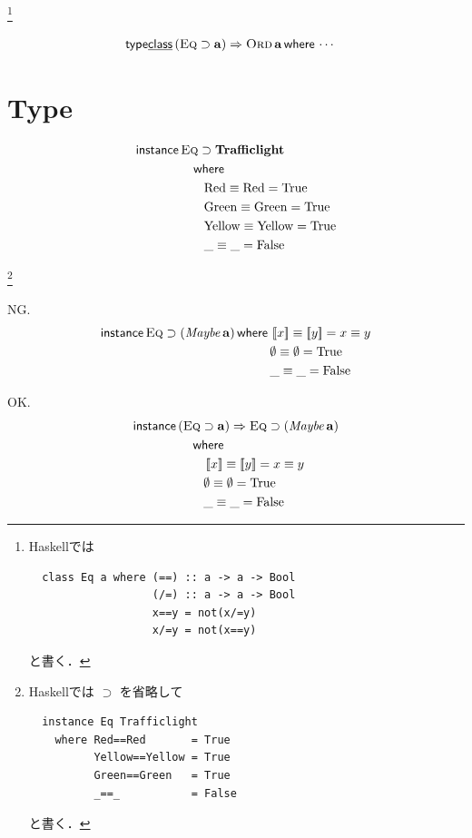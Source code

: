 \documentclass[a4paper,twocolumn]{jsbook}
\def\[{\left[\!\left[}
\def\]{\right]\!\right]}
\newcommand{\programminglanguage}[1]{\textsf{#1}}
\newcommand{\haskell}{\programminglanguage{Haskell}}
\newcommand{\mKeyword}[1]{\mathsf{#1}} %
\newcommand{\mKeywordUnderline}[1]{\text{\underline{\textsf{#1}}}} %
\newcommand{\mInstanceKeyword}{\mKeyword{instance}}
\newcommand{\mTypeClass}{\mKeyword{type}\mKeywordUnderline{class}}
\newcommand{\mWhereKeyword}{\mKeyword{where}}
\DeclareMathOperator{\mInstance}{\mInstanceKeyword}
\DeclareMathOperator{\mWhere}{\mWhereKeyword}
\newcommand{\mConst}[1]{\mathrm{#1}}
\newcommand{\mSpecialConst}[1]{\mathrm{#1}} %
\newcommand{\mFalse}{\mSpecialConst{False}}
\newcommand{\mNothing}{\emptyset}
\newcommand{\mTrue}{\mSpecialConst{True}}
\newcommand{\mAnyParam}{\_}
\DeclareMathOperator{\mConst}{const}
\DeclareMathOperator{\mLetEq}{\triangleq}
\newcommand{\mType}[1]{\mathbf{#1}}
\newcommand{\mMaybeWith}[1]{\[#1\]}
\newcommand{\mTypeConstructor}[1]{\mathit{#1}} %
\DeclareMathOperator{\mMaybeTypeConstructor}{\mTypeConstructor{Maybe}}
\newcommand{\mSpecialTypeClass}[1]{\textsc{#1}} %
\newcommand{\mEqTypeClass}{\mSpecialTypeClass{Eq}}
\newcommand{\mOrdTypeClass}{\mSpecialTypeClass{Ord}}
\newcommand{\mWhere}[2]{\mathbin{\mWhereKeyword}#1\mLetEq#2}
\begin{document}
{}\footnote{\haskell では
\begin{verbatim}
  class Eq a where (==) :: a -> a -> Bool
                   (/=) :: a -> a -> Bool
                   x==y = not(x/=y)
                   x/=y = not(x==y)
\end{verbatim}
と書く．}

\begin{align*}
\mTypeClass\,(\mEqTypeClass\supset\mType{a})\Rightarrow\mathop{\mOrdTypeClass}\mType{a}\mWhere{}
&\dotsb
\end{align*}

\section{Type}

\begin{align*}
\mInstance&
\mathop{\mEqTypeClass}\supset\mType{Trafficlight}\\
&\quad\mWhere{}\\
&\qquad\mConst{Red}\equiv\mConst{Red}=\mTrue\\
&\qquad\mConst{Green}\equiv\mConst{Green}=\mTrue\\
&\qquad\mConst{Yellow}\equiv\mConst{Yellow}=\mTrue\\
&\qquad\mAnyParam\equiv\mAnyParam=\mFalse
\end{align*}

{}\footnote{\haskell では $\supset$ を省略して
\begin{verbatim}
  instance Eq Trafficlight
    where Red==Red       = True
          Yellow==Yellow = True
          Green==Green   = True
          _==_           = False
\end{verbatim}
と書く．}

NG.
\begin{align*}
\mInstance\mathop{\mEqTypeClass}\supset(\mMaybeTypeConstructor\mType{a})\mWhere{}
&\mMaybeWith{x}\equiv\mMaybeWith{y}=x\equiv y\\
&\mNothing\equiv\mNothing=\mTrue\\
&\mAnyParam\equiv\mAnyParam=\mFalse
\end{align*}

OK.
\begin{align*}
\mInstance{}
&(\mEqTypeClass\supset\mType{a})\Rightarrow
\mEqTypeClass\supset(\mMaybeTypeConstructor\mType{a})\\
&\quad\mWhere{}\\
&\qquad\mMaybeWith{x}\equiv\mMaybeWith{y}=x\equiv y\\
&\qquad\mNothing\equiv\mNothing=\mTrue\\
&\qquad\mAnyParam\equiv\mAnyParam=\mFalse
\end{align*}
\end{document}
